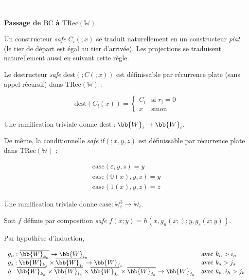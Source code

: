 \documentclass{article}
\newcommand{\TRec}[1]{\text{TRec}\left(\mathbb{#1}\right)}
\begin{document}
		
		\begin{demo}
			\textcolor{white}{T} %
			
			\textbf{Passage de $\text{BC}$ à $\TRec{W}$}
			
			Un constructeur \emph{safe} $C_i(; x)$ se traduit naturellement en un constructeur \emph{plat} (le tier de départ est égal au tier d'arrivée). Les projections se traduisent naturellement aussi en suivant cette règle.
			
			Le destructeur \emph{safe} $\text{dest} \left( ; C\left(; x\right) \right)$ est définissable par récurrence plate (sans appel récursif) dans $\TRec{W}$ : 
			
			\[
				\text{dest} \left( C_i\left( x\right) \right) = 
				\left\lbrace \begin{array}{ll}
				C_i	& \text{si $r_i = 0$} \\
				x	& \text{sinon}
				\end{array} \right.
			\]
			
			Une ramification triviale donne $\text{dest} : \bb{W}_i \to \bb{W}_i$.
			
			De même, la conditionnelle \emph{safe} $\text{if} \left( ; x, y, z\right)$ est définissable par récurrence plate dans $\TRec{W}$ : 
			
			\[
				\begin{array}{l}
				\text{case}(\varepsilon, y, z) = y \\
				\text{case}(0(x), y, z) = y \\
				\text{case}(1(x), y, z) = z
				\end{array}
			\]
			
			Une ramification triviale donne $\text{case} : \mathbb{W}_i^3 \to \mathbb{W}_i$.
			
			Soit $f$ définie par composition \emph{safe} $f\left( \bar{x} ; \bar{y}\right) = h\left( \bar{x}, g_n( \bar{x}; ) ; \bar{y}, g_s( \bar{x}; \bar{y} ) \right)$.
			
			Par hypothèse d'induction, 
			
			\[
				\begin{array}{ll}
				g_n : \overline{\bb{W}_{k_n}} \to \bb{W}_{i_n} & \text{avec $k_n > i_n$}\\
				g_s : \overline{\bb{W}_{k_s}} \times \overline{\bb{W}_{j_s}} \to \bb{W}_{j_s} & \text{avec $k_s > j_s$} \\
				h : \overline{\bb{W}_{k_h}} \times \overline{\bb{W}_{i_h}} \times \overline{\bb{W}_{j_h}} \times \overline{\bb{W}_{j_h}} \to \bb{W}_{j_h} & \text{avec $k_h, i_h > j_h$}
				\end{array}
			\]
			

\end{demo}
\end{document}
